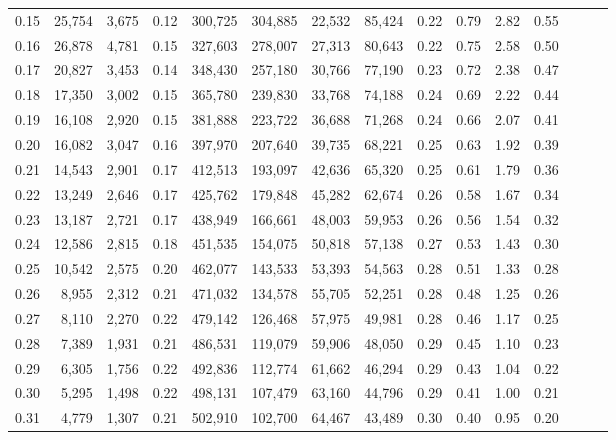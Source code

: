 \begin{tabular}{rrrrrrrrrrrrrrr}
0.15 &  25,754 &  3,675 &  0.12 &  300,725 &  304,885 &   22,532 &   85,424 &  0.22 &  0.79 &  2.82 &      0.55 \\
0.16 &  26,878 &  4,781 &  0.15 &  327,603 &  278,007 &   27,313 &   80,643 &  0.22 &  0.75 &  2.58 &      0.50 \\
0.17 &  20,827 &  3,453 &  0.14 &  348,430 &  257,180 &   30,766 &   77,190 &  0.23 &  0.72 &  2.38 &      0.47 \\
0.18 &  17,350 &  3,002 &  0.15 &  365,780 &  239,830 &   33,768 &   74,188 &  0.24 &  0.69 &  2.22 &      0.44 \\
0.19 &  16,108 &  2,920 &  0.15 &  381,888 &  223,722 &   36,688 &   71,268 &  0.24 &  0.66 &  2.07 &      0.41 \\
0.20 &  16,082 &  3,047 &  0.16 &  397,970 &  207,640 &   39,735 &   68,221 &  0.25 &  0.63 &  1.92 &      0.39 \\
0.21 &  14,543 &  2,901 &  0.17 &  412,513 &  193,097 &   42,636 &   65,320 &  0.25 &  0.61 &  1.79 &      0.36 \\
0.22 &  13,249 &  2,646 &  0.17 &  425,762 &  179,848 &   45,282 &   62,674 &  0.26 &  0.58 &  1.67 &      0.34 \\
0.23 &  13,187 &  2,721 &  0.17 &  438,949 &  166,661 &   48,003 &   59,953 &  0.26 &  0.56 &  1.54 &      0.32 \\
0.24 &  12,586 &  2,815 &  0.18 &  451,535 &  154,075 &   50,818 &   57,138 &  0.27 &  0.53 &  1.43 &      0.30 \\
0.25 &  10,542 &  2,575 &  0.20 &  462,077 &  143,533 &   53,393 &   54,563 &  0.28 &  0.51 &  1.33 &      0.28 \\
0.26 &   8,955 &  2,312 &  0.21 &  471,032 &  134,578 &   55,705 &   52,251 &  0.28 &  0.48 &  1.25 &      0.26 \\
0.27 &   8,110 &  2,270 &  0.22 &  479,142 &  126,468 &   57,975 &   49,981 &  0.28 &  0.46 &  1.17 &      0.25 \\
0.28 &   7,389 &  1,931 &  0.21 &  486,531 &  119,079 &   59,906 &   48,050 &  0.29 &  0.45 &  1.10 &      0.23 \\
0.29 &   6,305 &  1,756 &  0.22 &  492,836 &  112,774 &   61,662 &   46,294 &  0.29 &  0.43 &  1.04 &      0.22 \\
0.30 &   5,295 &  1,498 &  0.22 &  498,131 &  107,479 &   63,160 &   44,796 &  0.29 &  0.41 &  1.00 &      0.21 \\
0.31 &   4,779 &  1,307 &  0.21 &  502,910 &  102,700 &   64,467 &   43,489 &  0.30 &  0.40 &  0.95 &      0.20 \\

\end{tabular}
